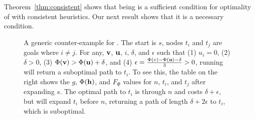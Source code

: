 Theorem~\ref{thm:consistent} shows that being \axiomcons is a sufficient condition for optimality of \kastarphi with consistent heuristics.
Our next result shows that it is a necessary condition. 
\begin{figure}
  \centering
   \hfill
  \caption[Generic counter-example for \kastarphi]{A generic counter-example for \kastarphi. 
  The start is $s$, nodes $t_i$ and $t_j$ are goals where $i\neq j$. For any, $\mathbf{v}$, $\mathbf{u}$, $i$, $\delta$, and $\epsilon$ such that (1) $u_i = 0$, (2) $\delta > 0$, (3) $\Phi(\mathbf{v}) > \Phi(\mathbf{u}) + \delta$, and (4) $\epsilon = \frac{\Phi(v) - \Phi(\mathbf{u}) - \delta}{3} > 0$, running \kastarphi will return a suboptimal path to $t_i$.   To see this, the table on the right shows the $g$, $\Phi(\mathbf{h})$, and $F_\Phi$ values for $n$, $t_i$, and $t_j$ after expanding $s$. The optimal path to $t_i$ is through $n$ and costs $\delta+\epsilon$, but \kastarphi will expand $t_i$ before $n$, returning a path of length $\delta+2\epsilon$ to $t_i$, which is suboptimal.}
  \label{fig:kstarphi-bad}
\end{figure}
